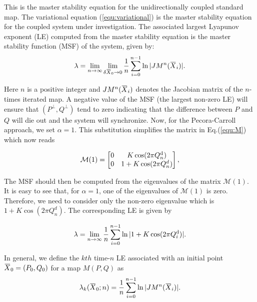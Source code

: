 \documentclass[reprint,amsmath,amssymb,aps,pre]{revtex4-1}
\newcommand{\overbar}[1]{\mkern 1.5mu\overline{\mkern-1.5mu#1\mkern-1.5mu}\mkern 1.5mu}
\begin{document}
This is the master stability equation for the unidirectionally coupled 
standard map. The variational equation (\ref{equ:variational}) is the master 
stability equation for the coupled system under investigation. The associated 
largest Lyapunov exponent (LE) computed from the master stability equation is the master stability function (MSF) of the system, given by:
\begin{equation}
\label{equ:msf}
\lambda  = \lim_{n \rightarrow \infty} \lim_{\delta\overbar{X}_0\rightarrow 
0}\frac{1}{n}\sum^{n-1}_{i=0}\ln|JM^n(\overbar{X}_i)|.
\end{equation}

Here $n$ is a positive integer and $JM^n(\overbar{X}_i)$ denotes the Jacobian matrix of the $n$-times iterated map.  A negative value of the MSF (the largest non-zero LE) will ensure that $(P^\perp,Q^\perp) $ tend to zero indicating that the difference between $P$ and $Q$ will die out and the system will synchronize. Now, for the Pecora-Carroll approach, we set $\alpha = 1$. This substitution simplifies the matrix in Eq.(\ref{equ:M}) which now reads

\begin{equation} 
\mathcal{M}(1)= \begin{bmatrix} 0 & K\cos(2\pi Q^\textnormal{d}_n) \\ 0 & 1 + K\cos(2\pi 
Q^d_n) \end{bmatrix},
\end{equation}

The MSF should then be computed from the eigenvalues of the matrix $\mathcal{M}(1)$. It is easy to see that, for $\alpha =1$, one of the eigenvalues of   $\mathcal{M}(1)$ is zero. Therefore, we need to consider only the non-zero eigenvalue which is $1+K\cos(2\pi Q^d_n)$. The corresponding LE is given by

\begin{equation}
\label{equ:LE}
\lambda   = \lim_{n \rightarrow \infty} 
\frac{1}{n}\sum^{n-1}_{i=0}\ln|1+K\cos(2\pi Q^\textnormal{d}_i)|.
\end{equation}

In general, we define the $kth$ time-$n$ LE associated with an initial point $\overbar{X}_0 = (P_0,Q_0)$ for a map $M(P,Q)$ as
\begin{equation}
\label{equ:FLEf}
\lambda _k(\overbar{X}_0;n)  = 
\frac{1}{n}\sum^{n-1}_{i=0}\ln|JM^n(\overbar{X}_i)|.
\end{equation}
\end{document}
